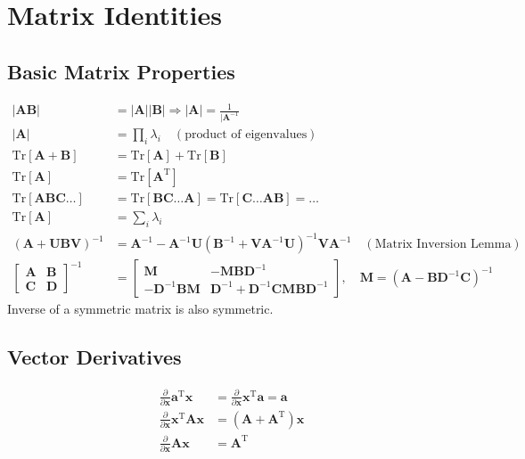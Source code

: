 \documentclass[a4paper]{article}
\begin{document}
\section{Matrix Identities}
\subsection{Basic Matrix Properties}
\begin{align*}
|\mathbf{AB}| &= |\mathbf{A}||\mathbf{B}| \Rightarrow |\mathbf{A}| = \frac{1}{|\mathbf{A}^{-1}} \\
|\mathbf{A}| &= \prod_i \lambda_i \quad (\text{product of eigenvalues}) \\
\textrm{Tr}[\mathbf{A}+\mathbf{B}] &= \textrm{Tr}[\mathbf{A}]+\textrm{Tr}[\mathbf{B}] \\
\textrm{Tr}[\mathbf{A}] &= \textrm{Tr}[\mathbf{A}^\textrm{T}] \\
\textrm{Tr}[\mathbf{ABC}\ldots] &= \textrm{Tr}[\mathbf{BC}\ldots\mathbf{A}] = \textrm{Tr}[\mathbf{C}\ldots \mathbf{AB}] = \ldots \\
\textrm{Tr}[\mathbf{A}] &= \sum_i \lambda_i \\
(\mathbf{A} + \mathbf{UBV})^{-1} &= \mathbf{A}^{-1} - \mathbf{A}^{-1}\mathbf{U}(\mathbf{B}^{-1}+\mathbf{V}\mathbf{A}^{-1}\mathbf{U})^{-1}\mathbf{V}\mathbf{A}^{-1} \quad(\text{Matrix Inversion Lemma}) \\
\begin{bmatrix}
\mathbf{A} & \mathbf{B} \\
\mathbf{C} & \mathbf{D}
\end{bmatrix}^{-1}
&=
\begin{bmatrix}
\mathbf{M} & -\mathbf{MBD}^{-1} \\
-\mathbf{D}^{-1}\mathbf{BM} & \mathbf{D}^{-1}+\mathbf{D}^{-1}\mathbf{CMB}\mathbf{D}^{-1}
\end{bmatrix}
, \quad \mathbf{M}=(\mathbf{A}-\mathbf{BD}^{-1}\mathbf{C})^{-1}
\end{align*}
Inverse of a symmetric matrix is also symmetric.

\subsection{Vector Derivatives}
\begin{align*}
\frac{\partial}{\partial\mathbf{x}}\mathbf{a}^\textrm{T}\mathbf{x} &= \frac{\partial}{\partial\mathbf{x}}\mathbf{x}^\textrm{T}\mathbf{a} = \mathbf{a} \\
\frac{\partial}{\partial\mathbf{x}}\mathbf{x}^\textrm{T}\mathbf{Ax} &= (\mathbf{A} + \mathbf{A}^\textrm{T})\mathbf{x} \\
\frac{\partial}{\partial\mathbf{x}}\mathbf{Ax} &= \mathbf{A}^\textrm{T}
\end{align*}
\end{document}
